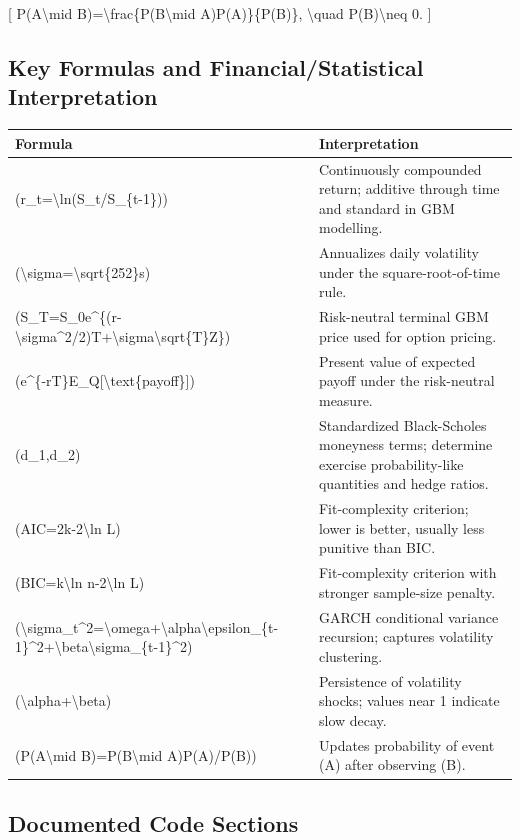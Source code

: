 \documentclass[
  11pt,
]{article}
\begin{document}
{[} P(A\textbackslash mid B)=\textbackslash frac\{P(B\textbackslash mid A)P(A)\}\{P(B)\}, \textbackslash quad P(B)\textbackslash neq 0. {]}

\subsection{Key Formulas and Financial/Statistical Interpretation}\label{key-formulas-and-financialstatistical-interpretation}

\begin{longtable}[]{@{}ll@{}}
\toprule\noalign{}
Formula & Interpretation \\
\midrule\noalign{}
\endhead
\bottomrule\noalign{}
\endlastfoot
(r\_t=\textbackslash ln(S\_t/S\_\{t-1\})) & Continuously compounded return; additive through time and standard in GBM modelling. \\
(\textbackslash sigma=\textbackslash sqrt\{252\}s) & Annualizes daily volatility under the square-root-of-time rule. \\
(S\_T=S\_0e\^{}\{(r-\textbackslash sigma\^{}2/2)T+\textbackslash sigma\textbackslash sqrt\{T\}Z\}) & Risk-neutral terminal GBM price used for option pricing. \\
(e\^{}\{-rT\}E\_Q{[}\textbackslash text\{payoff\}{]}) & Present value of expected payoff under the risk-neutral measure. \\
(d\_1,d\_2) & Standardized Black-Scholes moneyness terms; determine exercise probability-like quantities and hedge ratios. \\
(AIC=2k-2\textbackslash ln L) & Fit-complexity criterion; lower is better, usually less punitive than BIC. \\
(BIC=k\textbackslash ln n-2\textbackslash ln L) & Fit-complexity criterion with stronger sample-size penalty. \\
(\textbackslash sigma\_t\^{}2=\textbackslash omega+\textbackslash alpha\textbackslash epsilon\_\{t-1\}\^{}2+\textbackslash beta\textbackslash sigma\_\{t-1\}\^{}2) & GARCH conditional variance recursion; captures volatility clustering. \\
(\textbackslash alpha+\textbackslash beta) & Persistence of volatility shocks; values near 1 indicate slow decay. \\
(P(A\textbackslash mid B)=P(B\textbackslash mid A)P(A)/P(B)) & Updates probability of event (A) after observing (B). \\
\end{longtable}

\subsection{Documented Code Sections}\label{documented-code-sections}
\end{document}
